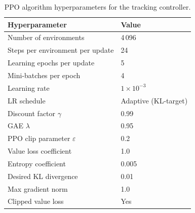 \documentclass{article}
\begin{document}
\begin{table}[h]
\centering
\caption{PPO algorithm hyperparameters for the tracking controller.}
\small
\begin{tabular}{@{}ll@{}}
\toprule
Hyperparameter & Value \\
\midrule
Number of environments & 4\,096 \\
Steps per environment per update & 24 \\
Learning epochs per update & 5 \\
Mini-batches per epoch & 4 \\
Learning rate & $1\times10^{-3}$ \\
LR schedule & Adaptive (KL-target) \\
Discount factor $\gamma$ & 0.99 \\
GAE $\lambda$ & 0.95 \\
PPO clip parameter $\varepsilon$ & 0.2 \\
Value loss coefficient & 1.0 \\
Entropy coefficient & 0.005 \\
Desired KL divergence & 0.01 \\
Max gradient norm & 1.0 \\
Clipped value loss & Yes \\
\bottomrule
\end{tabular}
\label{tab:ppo}
\end{table}
\end{document}
